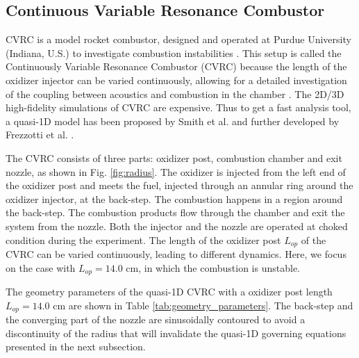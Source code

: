 \subsection{Continuous Variable Resonance Combustor} \label{sec:5.res.4}

CVRC is a model rocket combustor, designed and operated at Purdue University (Indiana, U.S.) to investigate combustion instabilities \cite{yu2008combustion}. This setup is called the Continuously Variable Resonance Combustor (CVRC) because the length of the oxidizer injector can be varied continuously, allowing for a detailed investigation of the coupling between acoustics and combustion in the chamber \cite{garby2013simulations}. The 2D/3D high-fidelity simulations of CVRC are expensive. Thus to get a fast analysis tool, a quasi-1D model has been proposed by Smith et al. \cite{smith2008computational} and further developed by Frezzotti et al. \cite{frezzotti2015determination,frezzotti2017numerical,frezzotti2018quasi}. 


The CVRC consists of three parts: oxidizer post, combustion chamber and exit nozzle, as shown in Fig. \ref{fig:radius}. The oxidizer is injected from the left end of the oxidizer post and meets the fuel, injected through an annular ring around the oxidizer injector, at the back-step. The combustion happens in a region around the back-step. The combustion products flow through the chamber and exit the system from the nozzle.  Both the injector and the nozzle are operated at choked condition during the experiment. The length of the oxidizer post $L_{op}$ of the CVRC can be varied continuously, leading to different dynamics. Here, we focus on the case with $L_{op}= 14.0$ cm, in which the combustion is unstable.

The geometry parameters of the quasi-1D CVRC with a oxidizer post length  $L_{op}= 14.0$ cm are shown in Table \ref{tab:geometry_parameters}.  The back-step and the converging part of the nozzle are sinusoidally contoured to avoid a discontinuity of the radius that will invalidate the quasi-1D governing equations presented in the next subsection.

